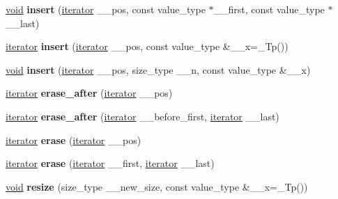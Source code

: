 \begin{DoxyCompactItemize}
\item 
\mbox{\label{classslist_a33c00375362b8076a18f877c871bbc5f}} 
\hyperlink{interfacevoid}{void} {\bfseries insert} (\hyperlink{structiterator}{iterator} \+\_\+\+\_\+pos, const value\+\_\+type $\ast$\+\_\+\+\_\+first, const value\+\_\+type $\ast$\+\_\+\+\_\+last)
\item 
\mbox{\label{classslist_a79a5f540bab58770914eacfb31246003}} 
\hyperlink{structiterator}{iterator} {\bfseries insert} (\hyperlink{structiterator}{iterator} \+\_\+\+\_\+pos, const value\+\_\+type \&\+\_\+\+\_\+x=\+\_\+\+Tp())
\item 
\mbox{\label{classslist_acc1b8600d4a9839c3465dc228bdbee2c}} 
\hyperlink{interfacevoid}{void} {\bfseries insert} (\hyperlink{structiterator}{iterator} \+\_\+\+\_\+pos, size\+\_\+type \+\_\+\+\_\+n, const value\+\_\+type \&\+\_\+\+\_\+x)
\item 
\mbox{\label{classslist_a935cbe6dae711ad6f9842686f8ea7258}} 
\hyperlink{structiterator}{iterator} {\bfseries erase\+\_\+after} (\hyperlink{structiterator}{iterator} \+\_\+\+\_\+pos)
\item 
\mbox{\label{classslist_a0f5c4ce0e472bd4687837b7693ce4127}} 
\hyperlink{structiterator}{iterator} {\bfseries erase\+\_\+after} (\hyperlink{structiterator}{iterator} \+\_\+\+\_\+before\+\_\+first, \hyperlink{structiterator}{iterator} \+\_\+\+\_\+last)
\item 
\mbox{\label{classslist_a35dbce9c988530781c80307368e317ae}} 
\hyperlink{structiterator}{iterator} {\bfseries erase} (\hyperlink{structiterator}{iterator} \+\_\+\+\_\+pos)
\item 
\mbox{\label{classslist_a4dd3ecbe29ec0a3e84a75d08718aca4b}} 
\hyperlink{structiterator}{iterator} {\bfseries erase} (\hyperlink{structiterator}{iterator} \+\_\+\+\_\+first, \hyperlink{structiterator}{iterator} \+\_\+\+\_\+last)
\item 
\mbox{\label{classslist_a1d99fd21f8e8ad06a19cbea248d89211}} 
\hyperlink{interfacevoid}{void} {\bfseries resize} (size\+\_\+type \+\_\+\+\_\+new\+\_\+size, const value\+\_\+type \&\+\_\+\+\_\+x=\+\_\+\+Tp())
\item 

\end{DoxyCompactItemize}
